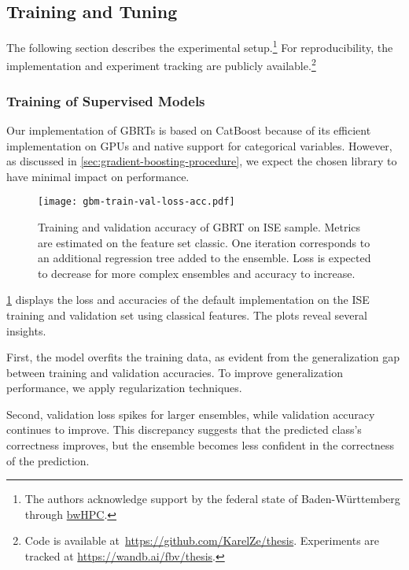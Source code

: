 \subsection{Training and Tuning}\label{sec:training-and-tuning}

The following section describes the experimental setup.\footnote{The authors acknowledge support by the federal state of Baden-Württemberg through \href{https://www.bwhpc.de/}{bwHPC}.} For reproducibility, the implementation and experiment tracking are publicly available.\footnote{Code is available at~\url{https://github.com/KarelZe/thesis}. Experiments are tracked at \url{https://wandb.ai/fbv/thesis}.}

\subsubsection{Training of Supervised
    Models}\label{sec:training-of-supervised-models}

Our implementation of \glspl{GBRT} is based on CatBoost \autocite[][5--6]{prokhorenkovaCatBoostUnbiasedBoosting2018} because of its efficient implementation on \glspl{GPU} and native support for categorical variables. However, as discussed in \cref{sec:gradient-boosting-procedure}, we expect the chosen library to have minimal impact on performance.

\begin{figure}[ht]
    \centering
    \texttt{[image: gbm-train-val-loss-acc.pdf]}
    \caption[Training and Validation Accuracy of Gradient Boosting]{Training and validation accuracy of \gls{GBRT} on \gls{ISE} sample. Metrics are estimated on the feature set classic. One iteration corresponds to an additional regression tree added to the ensemble. Loss is expected to decrease for more complex ensembles and accuracy to increase.}
    \label{fig:gbm-train-val-loss-acc}
\end{figure}

\cref{fig:gbm-train-val-loss-acc} displays the loss and accuracies of the default implementation on the \gls{ISE} training and validation set using classical features. The plots reveal several insights.

First, the model overfits the training data, as evident from the generalization gap between training and validation accuracies. To improve generalization performance, we apply regularization techniques.

Second, validation loss spikes for larger ensembles, while validation accuracy continues to improve. This discrepancy suggests that the predicted class's correctness improves, but the ensemble becomes less confident in the correctness of the prediction.

